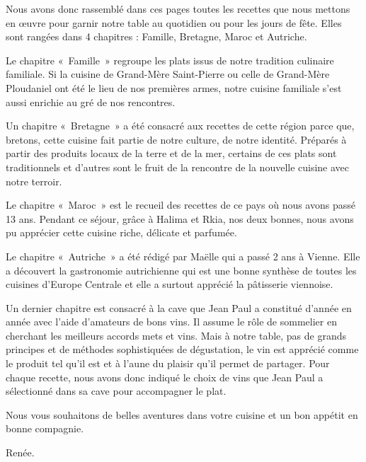 Nous avons donc rassemblé dans ces pages toutes les recettes que nous mettons en œuvre pour garnir notre table au quotidien ou pour les jours de fête. Elles sont rangées dans 4 chapitres : Famille, Bretagne, Maroc et Autriche.

Le chapitre « Famille » regroupe les plats issus de notre tradition culinaire familiale. Si la cuisine de Grand-Mère Saint-Pierre ou celle de Grand-Mère Ploudaniel ont été le lieu de nos premières armes, notre cuisine familiale s’est aussi enrichie au gré de nos rencontres.

Un chapitre « Bretagne » a été consacré aux recettes de cette région parce que, bretons, cette cuisine fait partie de notre culture, de notre identité. Préparés à partir des produits locaux de la terre et de la mer, certains de ces plats sont traditionnels et d’autres sont le fruit de la rencontre de la nouvelle cuisine avec notre terroir.

Le chapitre « Maroc » est le recueil des recettes de ce pays où nous avons passé 13 ans. Pendant ce séjour, grâce à Halima et Rkia, nos deux bonnes, nous avons pu apprécier cette cuisine riche, délicate et parfumée.

Le chapitre « Autriche » a été rédigé par Maëlle qui a passé 2 ans à Vienne. Elle a découvert la gastronomie autrichienne qui est une bonne synthèse de toutes les cuisines d’Europe Centrale et elle a surtout apprécié la pâtisserie viennoise.

Un dernier chapitre est consacré à la cave que Jean Paul a constitué d’année en année avec l’aide d’amateurs de bons vins. Il assume le rôle de sommelier en cherchant les meilleurs accords mets et vins. Mais à notre table, pas de grands principes et de méthodes sophistiquées de dégustation, le vin est apprécié comme le produit tel qu’il est et à l’aune du plaisir qu’il permet de partager. Pour chaque recette, nous avons donc indiqué le choix de vins que Jean Paul a sélectionné dans sa cave pour accompagner le plat.

Nous vous souhaitons de belles aventures dans votre cuisine et un bon appétit en bonne compagnie.

\vspace{16pt}
\hfill
\parbox{2cm}{
Renée.
}
